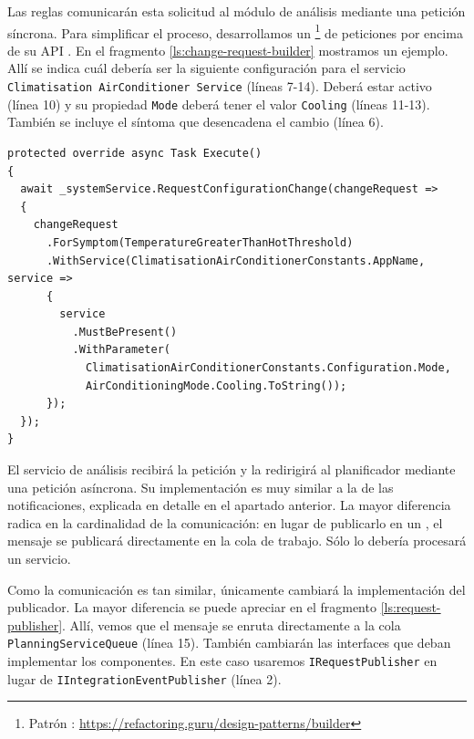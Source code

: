 Las reglas comunicarán esta solicitud al módulo de análisis mediante una petición síncrona. Para simplificar el proceso, desarrollamos un \footnote{Patrón : \url{https://refactoring.guru/design-patterns/builder}} de peticiones por encima de su API . En el fragmento \ref{ls:change-request-builder} mostramos un ejemplo. Allí se indica cuál debería ser la siguiente configuración para el servicio \texttt{Climatisation AirConditioner Service} (líneas 7-14). Deberá estar activo (línea 10) y su propiedad \texttt{Mode} deberá tener el valor \texttt{Cooling} (líneas 11-13). También se incluye el síntoma que desencadena el cambio (línea 6).

\begin{lstlisting}[caption={Implementación de la misma petición siguiendo el patrón \emph{builder}.\protect\footnotemark},captionpos=b, label=ls:change-request-builder]
protected override async Task Execute()
{
  await _systemService.RequestConfigurationChange(changeRequest =>
  {
    changeRequest
      .ForSymptom(TemperatureGreaterThanHotThreshold)
      .WithService(ClimatisationAirConditionerConstants.AppName, service =>
      {
        service
          .MustBePresent()
          .WithParameter(
            ClimatisationAirConditionerConstants.Configuration.Mode,
            AirConditioningMode.Cooling.ToString());
      });
  });
}
\end{lstlisting}


El servicio de análisis recibirá la petición y la redirigirá al planificador mediante una petición asíncrona. Su implementación es muy similar a la de las notificaciones, explicada en detalle en el apartado anterior. La mayor diferencia radica en la cardinalidad de la comunicación: en lugar de publicarlo en un , el mensaje se publicará directamente en la cola de trabajo. Sólo lo debería procesará un servicio.

Como la comunicación es tan similar, únicamente cambiará la implementación del publicador. La mayor diferencia se puede apreciar en el fragmento \ref{ls:request-publisher}. Allí, vemos que el mensaje se enruta directamente a la cola \texttt{PlanningServiceQueue} (línea 15). También cambiarán las interfaces que deban implementar los componentes. En este caso usaremos \texttt{IRequestPublisher} en lugar de \texttt{IIntegrationEventPublisher} (línea 2).

